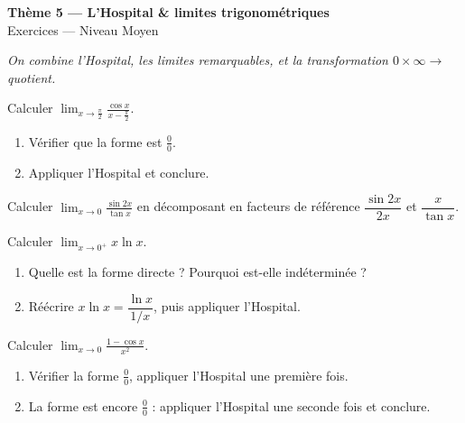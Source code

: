 \documentclass[11pt,a4paper]{article}
\begin{document}
\begin{center}
{\Large\bfseries\color{primarydark}Thème 5 — L'Hospital \& limites trigonométriques}\\[2pt]
{\large\color{primary}Exercices — Niveau Moyen}
\end{center}
\vspace{4pt}
{\small\itshape On combine l'Hospital, les limites remarquables, et la transformation $0\times\infty\to$
quotient.}
\vspace{6pt}

\begin{exercice}
Calculer $\displaystyle\lim_{x\to \frac{\pi}{2}}\frac{\cos x}{x-\frac{\pi}{2}}$.
\begin{enumerate}[label=\alph*),leftmargin=2em,itemsep=3pt]
  \item Vérifier que la forme est $\frac00$.
  \item Appliquer l'Hospital et conclure.
\end{enumerate}
\end{exercice}

\begin{exercice}
Calculer $\displaystyle\lim_{x\to 0}\frac{\sin 2x}{\tan x}$ en décomposant en facteurs de référence
$\dfrac{\sin 2x}{2x}$ et $\dfrac{x}{\tan x}$.
\end{exercice}

\begin{exercice}
Calculer $\displaystyle\lim_{x\to 0^{+}} x\ln x$.
\begin{enumerate}[label=\alph*),leftmargin=2em,itemsep=3pt]
  \item Quelle est la forme directe ? Pourquoi est-elle indéterminée ?
  \item Réécrire $x\ln x=\dfrac{\ln x}{1/x}$, puis appliquer l'Hospital.
\end{enumerate}
\end{exercice}

\begin{exercice}
Calculer $\displaystyle\lim_{x\to 0}\frac{1-\cos x}{x^2}$.
\begin{enumerate}[label=\alph*),leftmargin=2em,itemsep=3pt]
  \item Vérifier la forme $\frac00$, appliquer l'Hospital une première fois.
  \item La forme est encore $\frac00$ : appliquer l'Hospital une seconde fois et conclure.
\end{enumerate}
\end{exercice}
\end{document}
